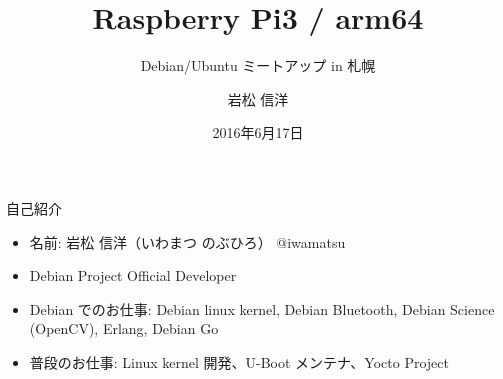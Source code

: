 \newcommand{\textframe}[1]{
	\begin{frame}{}
	\begin{center}
	 {\Huge #1
		  }
	 \end{center}
	 \end{frame}
}


\title{Raspberry Pi3 / arm64}
\subtitle{Debian/Ubuntu ミートアップ in 札幌}
\author{岩松 信洋}
\date{2016年6月17日}



\begin{frame}
\titlepage{}
\end{frame}


\begin{frame}{自己紹介}

\begin{itemize}
\item 名前: 岩松 信洋（いわまつ のぶひろ） @iwamatsu
\item Debian Project Official Developer
\item Debian でのお仕事: Debian linux kernel, Debian Bluetooth, Debian Science (OpenCV), Erlang, Debian Go
\item 普段のお仕事: Linux kernel 開発、U-Boot メンテナ、Yocto Project
\end{itemize} 
\end{frame}

%


